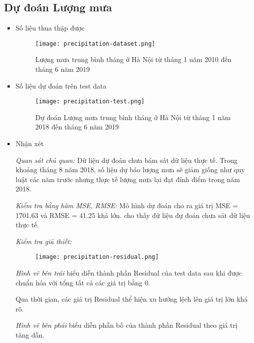 \documentclass[12pt]{article}
\begin{document}
    \subsection{Dự đoán Lượng mưa}
    \begin{itemize}
        \item Số liệu thua thập được
            \begin{figure}[H]
                \centering
                \texttt{[image: precipitation-dataset.png]}
                \caption{Lượng mưa trung bình tháng ở Hà Nội từ tháng 1 năm 2010 đến tháng 6 năm 2019}
            \end{figure}
        
        \item Số liệu dự đoán trên test data
            \begin{figure}[H]
                \centering
                \texttt{[image: precipitation-test.png]}
                \caption{Dự đoán Lượng mưa trung bình tháng ở Hà Nội từ tháng 1 năm 2018 đến tháng 6 năm 2019}
            \end{figure}
            
        \item Nhận xét
        
            \textit{Quan sát chủ quan:} Dữ liệu dự đoán chưa bám sát dữ liệu thực tế. Trong khoảng tháng 8 năm 2018, số liệu dự báo lượng mưa sẽ giảm giống như quy luật các năm trước nhưng thực tế lượng mưa lại đạt đỉnh điểm trong năm 2018.
            
            \textit{Kiểm tra bằng hàm MSE, RMSE:} Mô hình dự đoán cho ra giá trị MSE = 1701.63 và RMSE = 41.25 khá lớn. cho thấy dữ liệu dự đoán chưa sát dữ liệu thực tế.
            
            \textit{Kiểm tra giả thiết:}
            
            \begin{figure}[H]
                \centering
                \texttt{[image: precipitation-residual.png]}
                \caption{}
            \end{figure}
            
            \textit{Hình vẽ bên trái} biểu diễn thành phần Residual của test data sau khi được chuẩn hóa với tổng tất cả các giá trị bằng 0.
            
            Qua thời gian, các giá trị Residual thể hiện xu hướng lệch lên giá trị lớn khá rõ.
            
            \textit{Hình vẽ bên phải} biểu diễn phẫn bố của thành phần Residual theo giá trị tăng dần. 
            

\end{itemize}
\end{document}
